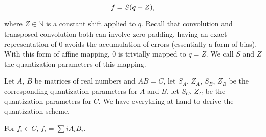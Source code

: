 \begin{equation}
 $$f = S(q - Z),$$
\end{equation}

where $Z \in \mathbb{N}$ is a constant shift applied to $q$. Recall that convolution and transposed convolution
both can involve zero-padding, having an exact representation of $0$ avoids the accumulation of errors
(essentially a form of bias). With this form of affine mapping, $0$ is trivially mapped to $q = Z$. We call
$S$ and $Z$ the quantization parameters of this mapping.

Let $A$, $B$ be matrices of real numbers and $A B = C$, let $S_A$, $Z_A$, $S_B$, $Z_B$ be the corresponding quantization parameters for $A$ and $B$, let $S_C$, $Z_C$ be the quantization parameters for $C$. We have
everything at hand to derive the quantization scheme.

For $f_i \in C$, $f_i = \sum{i} A_i B_i$.
\clearpage %
